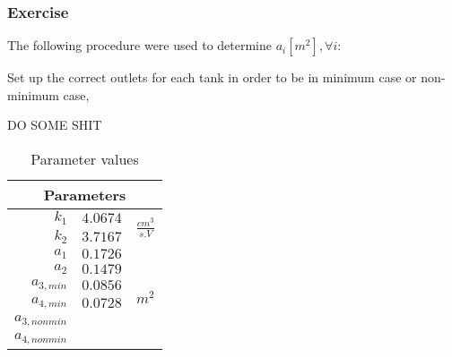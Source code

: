 \subsubsection{Exercise} 

The following procedure were used to determine $a_i \left[m^2\right], \forall i$:

\begin{shortitemize}
    \item Set up the correct outlets for each tank in order to be in minimum case or non-minimum case,
    \item DO SOME SHIT
\end{shortitemize}

\begin{table}[h!b]
    \centering
    \begin{tabular}{|r|l|c|}
        \hline
        \multicolumn{3}{|c|}{Parameters}\\
        \hline
        $k_1$           & $4.0674$ & \multirow{2}{*}{$\frac{cm^3}{s.V}$}  \\
        $k_2$           & $3.7167$  & \\
        \hline 
        $a_1$           & $0.1726$  & \multirow{6}{*}{$m^2$}  \\
        $a_2$           & $0.1479$  & \\
        $a_{3,min}$     & $0.0856$  & \\
        $a_{4,min}$     & $0.0728$  & \\
        $a_{3,nonmin}$  &   & \\
        $a_{4,nonmin}$  &   & \\
        \hline
    \end{tabular}
    \caption{Parameter values}
    \label{parameterDetermination}
\end{table}
